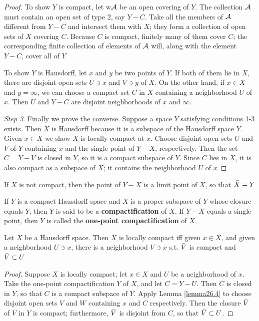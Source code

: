 \documentclass[11pt]{article}
\begin{document}
\begin{proof}
To show \(Y\) is compact, let w\(\mathcal{A}\) be an open covering of \(Y\). The collection \(\mathcal{A}\) must
contain an open set of type 2, say \(Y-C\). Take all the members of \(\mathcal{A}\) different from \(Y-C\)
and intersect them with \(X\); they form a collection of open sets of \(X\) covering \(C\).
Because \(C\) is compact, finitely many of them cover \(C\); the corresponding finite collection
of elements of \(\mathcal{A}\) will, along with the element \(Y-C\), cover all of \(Y\)

To show \(Y\) is Hausdorff, let \(x\) and \(y\) be two points of \(Y\). If both of them lie
in \(X\), there are disjoint open sets \(U\ni x\) and \(V\ni y\) of \(X\). On the other hand,
if \(x\in X\) and \(y=\infty\), we can choose a compact set \(C\) in \(X\) containing a
neighborhood \(U\) of \(x\). Then \(U\) and \(Y-C\) are disjoint neighborhoods of \(x\)
and \(\infty\).

\emph{Step 3}. Finally we prove the converse. Suppose a space \(Y\) satisfying conditions 1-3 exists.
Then \(X\) is Hausdorff because it is a subspace of the Hausdorff space \(Y\). Given \(x\in X\) we
show \(X\) is locally compact at \(x\). Choose disjoint open sets \(U\) and \(V\) of \(Y\)
containing \(x\) and the single point of \(Y-X\), respectively. Then the set \(C=Y-V\) is closed
in \(Y\), so it is a compact subspace of \(Y\). Since \(C\) lies in \(X\), it is also compact as
a subspace of \(X\); it contains the neighborhood \(U\) of \(x\)
\end{proof}

If \(X\) is not compact, then the point of \(Y-X\) is a limit point of \(X\), so that \(\bar{X}=Y\)

\begin{definition}[]
If \(Y\) is a compact Hausdorff space and \(X\) is a proper subspace of \(Y\) whose closure
equals \(Y\), then \(Y\) is said to be a \textbf{compactification} of \(X\). If \(Y-X\) equals a single
point, then \(Y\) is called the \textbf{one-point compactification} of \(X\).
\end{definition}

\begin{theorem}[]
Let \(X\) be a Hausdorff space. Then \(X\) is locally compact iff given \(x\in X\), and given a
neighborhood \(U\ni x\), there is a neighborhood \(V\ni x\) s.t. \(\bar{V}\) is compact
and \(\bar{V}\subset U\)
\end{theorem}

\begin{proof}
Suppose \(X\) is locally compact; let \(x\in X\) and \(U\) be a neighborhood of \(x\). Take the
one-point compactification \(Y\) of \(X\), and let \(C=Y-U\). Then \(C\) is closed in \(Y\), so
that \(C\) is a compact subspace of \(Y\). Apply Lemma \ref{lemma26.4} to choose disjoint open
sets \(V\) and \(W\) containing \(x\) and \(C\) respectively. Then the closure \(\bar{V}\)
of \(V\) in \(Y\) is compact; furthermore, \(\bar{V}\) is disjoint from \(C\), so
that \(\bar{V}\subset U\).
\end{proof}
\end{document}
